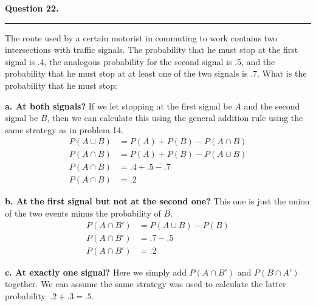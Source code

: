 \textbf{Question 22.} \\
\hrule 

The route used by a certain motorist in commuting to work contains two intersections with traffic signals. The probability that he must stop at the first signal is .4, the analogous probability for the second signal is .5, and the probability that he must stop at at  least one of the two signals is .7. What is the probability that he must stop:

\textbf{a. At both signals?} \newline 
If we let stopping at the first signal be $A$ and the second signal be $B$, then we can calculate this using the general addition rule using the same strategy as in problem 14.
\begin{align*}
    P(A \cup B) &= P(A) + P(B) - P(A \cap B) \\
    P(A \cap B) &= P(A) + P(B) - P(A \cup B) \\ 
    P(A \cap B) &= .4 + .5 - .7 \\
    P(A \cap B) &= .2
\end{align*}

\textbf{b. At the first signal but not at the second one?} \newline 
This one is just the union of the two events minus the probability of $B$. 
\begin{align*}
P(A \cap B') &= P(A \cup B) - P(B) \\
P(A \cap B') &= .7 - .5 \\
P(A \cap B') &= .2
\end{align*}

\textbf{c. At exactly one signal?} \newline 
Here we simply add $P(A \cap B')$ and $P(B \cap A')$ together. We can assume the same strategy was used to calculate the latter probability. $.2 + .3 = \boxed{.5}$.